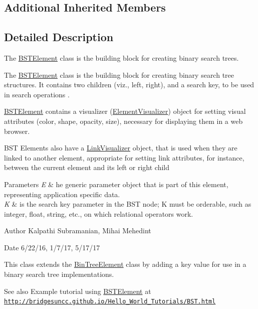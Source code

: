 \subsection*{Additional Inherited Members}


\subsection{Detailed Description}
The \hyperlink{classbridges_1_1base_1_1_b_s_t_element}{B\+S\+T\+Element} class is the building block for creating binary search trees. 

The \hyperlink{classbridges_1_1base_1_1_b_s_t_element}{B\+S\+T\+Element} class is the building block for creating binary search tree structures. It contains two children (viz., left, right), and a search key, to be used in search operations .

\hyperlink{classbridges_1_1base_1_1_b_s_t_element}{B\+S\+T\+Element} contains a visualizer (\hyperlink{classbridges_1_1base_1_1_element_visualizer}{Element\+Visualizer}) object for setting visual attributes (color, shape, opacity, size), necessary for displaying them in a web browser.

B\+S\+T Elements also have a \hyperlink{classbridges_1_1base_1_1_link_visualizer}{Link\+Visualizer} object, that is used when they are linked to another element, appropriate for setting link attributes, for instance, between the current element and its left or right child


\begin{DoxyParams}{Parameters}
{\em E} & he generic parameter object that is part of this element, representing application specific data. \\
\hline
{\em K} & is the search key parameter in the B\+S\+T node; K must be orderable, such as integer, float, string, etc., on which relational operators work.\\
\hline
\end{DoxyParams}
\begin{DoxyAuthor}{Author}
Kalpathi Subramanian, Mihai Mehedint
\end{DoxyAuthor}
\begin{DoxyDate}{Date}
6/22/16, 1/7/17, 5/17/17
\end{DoxyDate}
This class extends the \hyperlink{classbridges_1_1base_1_1_bin_tree_element}{Bin\+Tree\+Element} class by adding a \textquotesingle{}key\textquotesingle{} value for use in a binary search tree implementations.

\begin{DoxySeeAlso}{See also}
Example tutorial using \hyperlink{classbridges_1_1base_1_1_b_s_t_element}{B\+S\+T\+Element} at ~\newline
 \href{http://bridgesuncc.github.io/Hello_World_Tutorials/BST.html}{\tt http\+://bridgesuncc.\+github.\+io/\+Hello\+\_\+\+World\+\_\+\+Tutorials/\+B\+S\+T.\+html} 
\end{DoxySeeAlso}


